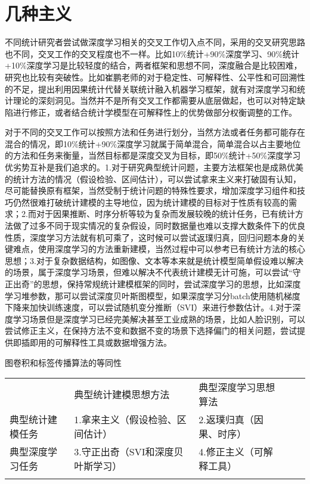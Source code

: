 \documentclass{ctexart}
\begin{document}
\section{几种主义}

不同统计研究者尝试做深度学习相关的交叉工作切入点不同，采用的交叉研究思路也不同，交叉工作的交叉程度也不一样。比如10\%统计+90\%深度学习、90\%统计+10\%深度学习是比较轻度的结合，两者框架和思想不同，深度融合是比较困难，研究也比较有突破性。比如崔鹏老师的对于稳定性、可解释性、公平性和可回溯性的不足，提出利用因果统计代替关联统计融入机器学习框架，就有对深度学习和统计理论的深刻洞见。当然并不是所有交叉工作都需要从底层做起，也可以对特定缺陷进行修正，或者结合统计学模型在可解释性上的优势做部分权衡调整的工作。

对于不同的交叉工作可以按照方法和任务进行划分，当然方法或者任务都可能存在混合的情况，即10\%统计+90\%深度学习就属于简单混合，简单混合以占主要地位的方法和任务来衡量，当然目标都是深度交叉为目标，即50\%统计+50\%深度学习优劣势互补是我们追求的。1.对于研究典型统计问题，主要方法框架也是成熟优美的统计方法的情况（假设检验、区间估计），可以尝试拿来主义来打破固有认知，尽可能替换原有框架，当然受制于统计问题的特殊性要求，增加深度学习组件和技巧仍然很难打破统计建模的主导地位，因为统计建模的目标对于性质有较高的需求；2.而对于因果推断、时序分析等较为复杂而发展较晚的统计任务，已有统计方法做了过多不同于现实情况的复杂假设，同时数据量也难以支撑大数条件下的优良性质，深度学习方法就有机可乘了，这时候可以尝试返璞归真，回归问题本身的关键难点，使用深度学习的方法重新建模，当然过程中可以参考已有统计方法的核心思想；3.对于复杂数据结构，如图像、文本等本来就是统计模型简单假设难以解决的场景，属于深度学习场景，但难以解决不代表统计建模无计可施，可以尝试“守正出奇”的思想，保持常规统计建模框架的同时，尝试深度学习的思想，比如深度学习堆参数，那可以尝试深度贝叶斯图模型，如果深度学习分batch使用随机梯度下降来加快训练速度，可以尝试随机变分推断（SVI）来进行参数估计。4.对于深度学习场景但是深度学习已经完美解决甚至工业成熟的场景，比如人脸识别，可以尝试修正主义，在保持方法不变和数据不变的场景下选择偏门的相关问题，尝试提供即插即用的可解释性工具或数据增强方法。


图卷积和标签传播算法的等同性

\begin{table}[]
      \begin{tabular}{lllll}
      \cline{2-3}
      \multicolumn{1}{l|}{}             & \multicolumn{1}{l|}{典型统计建模思想方法}          & \multicolumn{1}{l|}{典型深度学习思想算法}        &  &  \\ \cline{1-3}
      \multicolumn{1}{|l|}{典型统计建模任务}   & \multicolumn{1}{l|}{1.拿来主义（假设检验、区间估计）}   & \multicolumn{1}{l|}{2.返璞归真（因果、时序）}   &  &  \\ \cline{1-3}
      \multicolumn{1}{|l|}{典型深度学习任务} & \multicolumn{1}{l|}{3.守正出奇（SVI和深度贝叶斯学习）} & \multicolumn{1}{l|}{4.修正主义（可解释工具）} &  &  \\ \cline{1-3}
                                        &                                        &                                        &  & 
      \end{tabular}
      \end{table}
\end{document}
